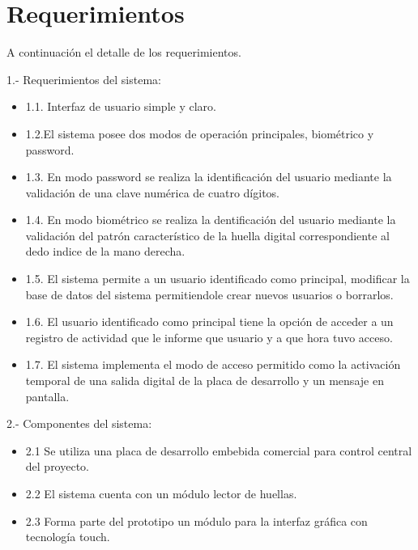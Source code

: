 \section{Requerimientos}
A continuación el detalle de los requerimientos.

1.- Requerimientos del sistema:

\begin{itemize}
\item 1.1. Interfaz de usuario simple y claro.	
\item 1.2.El sistema posee dos modos de operación principales, biométrico y password.
\item 1.3. En modo password se realiza la identificación del usuario mediante la validación de una clave numérica de cuatro dígitos.
\item 1.4. En modo biométrico se realiza la dentificación del usuario mediante la validación del patrón característico de la huella digital correspondiente al dedo indice de la mano derecha.
\item 1.5. El sistema permite a un usuario identificado como principal, modificar la base de datos del sistema permitiendole crear nuevos usuarios o borrarlos.
\item 1.6. El usuario identificado como principal tiene la opción de acceder a un registro de actividad que le informe que usuario y a que hora tuvo acceso.
\item 1.7. El sistema implementa el modo de acceso permitido como la activación temporal de una salida digital de la placa de desarrollo y un mensaje en pantalla.
\end{itemize}

2.- Componentes del sistema:
\begin{itemize}
\item 2.1 Se utiliza una placa de desarrollo embebida comercial para control central del proyecto.
\item 2.2 El sistema cuenta con un módulo lector de huellas.
\item 2.3 Forma parte del prototipo un módulo para la interfaz gráfica con tecnología touch.
\end{itemize}{}

